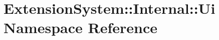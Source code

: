 \hypertarget{namespace_extension_system_1_1_internal_1_1_ui}{\section{Extension\-System\-:\-:Internal\-:\-:Ui Namespace Reference}
\label{namespace_extension_system_1_1_internal_1_1_ui}
}
